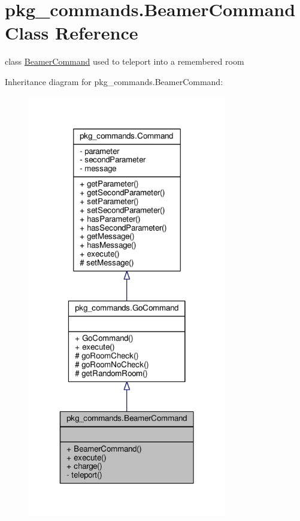 \hypertarget{classpkg__commands_1_1BeamerCommand}{\section{pkg\-\_\-commands.\-Beamer\-Command Class Reference}
\label{classpkg__commands_1_1BeamerCommand}
}


class \hyperlink{classpkg__commands_1_1BeamerCommand}{Beamer\-Command} used to teleport into a remembered room  




Inheritance diagram for pkg\-\_\-commands.\-Beamer\-Command\-:\nopagebreak
\begin{figure}[H]
\begin{center}
\leavevmode
\includegraphics[width=246pt]{classpkg__commands_1_1BeamerCommand__inherit__graph}
\end{center}
\end{figure}


